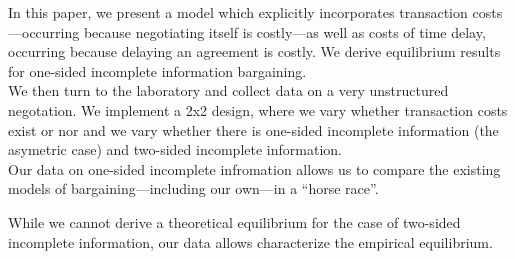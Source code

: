 In this paper, we present a model which explicitly incorporates transaction costs---occurring because negotiating itself is costly---as well as costs of time delay, occurring because delaying an agreement is costly. We derive equilibrium results for one-sided incomplete information bargaining. \\

We then turn to the laboratory and collect data on a very unstructured negotation. We implement a 2x2 design, where we vary whether transaction costs exist or nor and we vary whether there is one-sided incomplete information (the asymetric case) and two-sided incomplete information. \\

Our data on one-sided incomplete infromation allows us to compare the existing models of bargaining---including our own---in a ``horse race''.

While we cannot derive a theoretical equilibrium for the case of two-sided incomplete information, our data allows characterize the empirical equilibrium. 



